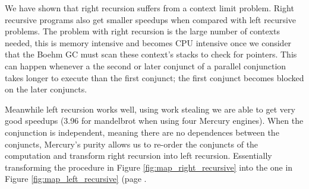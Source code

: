 

We have shown that right recursion suffers from a context limit problem.
Right recursive programs also get smaller speedups when compared with left
recursive problems.
The problem with right recursion is the large number of contexts needed,
this is memory intensive and becomes CPU intensive once we consider that
the Boehm GC must scan these context's stacks to check for pointers.
This can happen whenever a the second or later
conjunct of a parallel conjunction
takes longer to execute than the first conjunct;
the first conjunct becomes blocked on the later conjuncts.

Meanwhile left recursion works well,
using work stealing we are able to get very good speedups (3.96 for
mandelbrot when using four Mercury engines).
When the conjunction is independent,
meaning there are no dependences between the conjuncts,
Mercury's purity allows us to re-order the conjuncts of the computation and
transform right recursion into left recursion.
Essentially transforming the procedure in Figure
\ref{fig:map_right_recursive} into the one in Figure
\ref{fig:map_left_recursive} (page \pageref{fig:map_right_recursive}.

